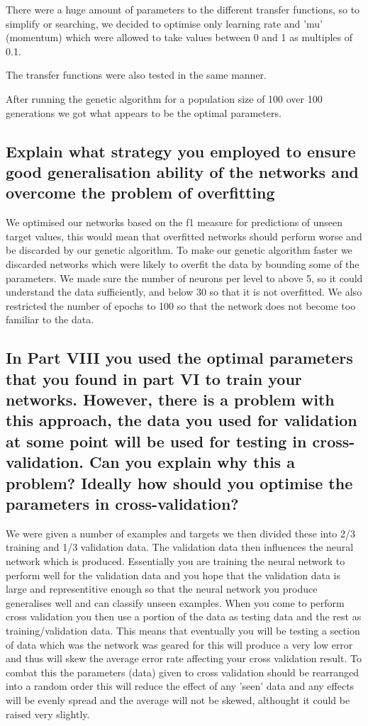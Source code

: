 \documentclass[11pt]{article}
\begin{document}
There were a huge amount of parameters to the different transfer functions, so to simplify or searching, we decided to optimise only learning rate and 'mu' (momentum) which were allowed to take values between 0 and 1 as multiples of 0.1.

The transfer functions were also tested in the same manner.

After running the genetic algorithm for a population size of 100 over 100 generations we got 
what appears to be the optimal parameters.

\subsection{Explain what strategy you employed to ensure good generalisation ability of the networks and overcome the problem of overfitting}

We optimised our networks based on the f1 measure for predictions of unseen target values, this would mean that overfitted networks should perform worse and be discarded by our genetic algorithm. To make our genetic algorithm faster we discarded networks which were likely to overfit the data by bounding some of the parameters. We made sure the number of neurons per level to above 5, so it could understand the data sufficiently, and below 30 so that it is not overfitted. We also restricted the number of epochs to 100 so that the network does not become too familiar to the data. 

\subsection{In Part VIII you used the optimal parameters that you found in part VI to train your networks. However, there is a problem with this approach, the data you used for validation at some point will be used for testing in cross-validation. Can you explain why this a problem? Ideally how should you optimise the parameters in cross-validation?}

We were given a number of examples and targets we then divided these into  2/3 training and 1/3 validation data. The validation data then influences the neural network which is produced. Essentially you are training the neural network to perform well for the validation data and you hope that the validation data is large and representitive enough so that the neural network you produce generalises well and can classify unseen examples. When you come to perform cross validation you then use a portion of the data as testing data and the rest as training/validation data. This means that eventually you will be testing a section of data which was the network was geared for this will produce a very low error and thus will skew the average error rate affecting your cross validation result. To combat this the parameters (data) given to cross validation should be rearranged into a random order this will reduce the effect of any 'seen' data and any effects will be evenly spread and the average will not be skewed, althought it could be raised very slightly.
\end{document}
